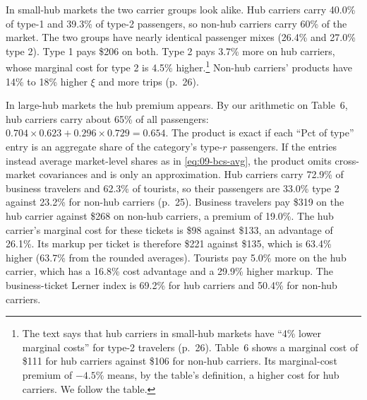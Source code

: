 In small-hub markets the two carrier groups look alike. Hub carriers carry 40.0\% of type-1 and 39.3\% of
type-2 passengers, so non-hub carriers carry 60\% of the market. The two groups have nearly identical
passenger mixes (26.4\% and 27.0\% type 2). Type 1 pays \$206 on both. Type 2 pays 3.7\% more on hub carriers,
whose marginal cost for type 2 is 4.5\% higher.\footnote{The text says that hub carriers in small-hub markets
have ``4\% lower marginal costs'' for type-2 travelers (p.~26). Table~6 shows a marginal cost of \$111 for
hub carriers against \$106 for non-hub carriers. Its marginal-cost premium of $-4.5\%$ means, by the table's
definition, a higher cost for hub carriers. We follow the table.} Non-hub carriers' products have
14\% to 18\% higher $\xi$ and more trips (p.~26).

In large-hub markets the hub premium appears. By our arithmetic on Table~6, hub carriers carry about 65\% of all
passengers: $0.704\times0.623+0.296\times0.729=0.654$. The product is exact if each ``Pct of type'' entry is an
aggregate share of the category's type-$r$ passengers. If the entries instead average market-level shares as in
\eqref{eq:09-bcs-avg}, the product omits cross-market covariances and is only an approximation. Hub carriers carry 72.9\% of business travelers and 62.3\% of
tourists, so their passengers are 33.0\% type 2 against 23.2\% for non-hub carriers (p.~25). Business
travelers pay \$319 on the hub carrier against \$268 on non-hub carriers, a premium of 19.0\%. The hub
carrier's marginal cost for these tickets is \$98 against \$133, an advantage of 26.1\%. Its markup per
ticket is therefore \$221 against \$135, which is 63.4\% higher (63.7\% from the rounded averages). Tourists
pay 5.0\% more on the hub carrier, which has a 16.8\% cost advantage and a 29.9\% higher markup. The
business-ticket Lerner index is 69.2\% for hub carriers and 50.4\% for non-hub carriers.

